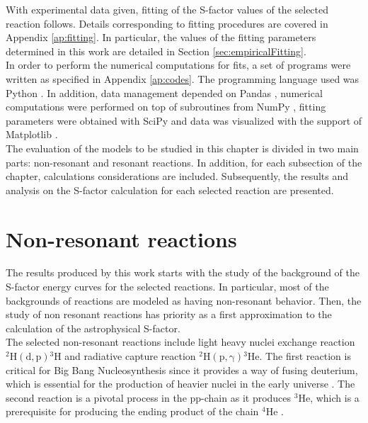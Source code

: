 \documentclass[openany]{book}
\begin{document}
With experimental data given, fitting of the S-factor values of the selected reaction follows. Details corresponding to fitting procedures are covered in Appendix \ref{ap:fitting}.  In particular, the values of the fitting parameters determined in this work are detailed in Section \ref{sec:empiricalFitting}.  \\

In order to perform the numerical computations for fits, a set of programs were written as specified in Appendix \ref{ap:codes}. The programming language used was Python \cite{rossum_drake_2009}. In addition, data management depended on Pandas \cite{mckinney_2010}, numerical computations were performed on top of subroutines from NumPy  \cite{harris_millman_vanderwalt_gommers_virtanen_cournapeau_wieser_taylor_berg_smith_et_2020}, fitting parameters were obtained with SciPy \cite{virtanen_gommers_oliphant_haberland_reddy_cournapeau_burovski_peterson_weckesser_bright_et_2020} and data was visualized with the support of Matplotlib \cite{hunter_2007}. \\

The evaluation of the models to be studied in this chapter is divided in two main parts: non-resonant and resonant reactions.  In addition, for each subsection of the chapter, calculations considerations are included. Subsequently, the results and analysis on the S-factor calculation for each  selected reaction are presented.

\section{Non-resonant reactions} \label{sec:nonResonant}

The  results produced by this work starts with the study of the background of the S-factor energy curves for the selected reactions. In particular, most of the backgrounds of reactions are modeled as having non-resonant behavior. Then, the study of non resonant reactions has priority as a first approximation to the calculation of the astrophysical S-factor. \\

The selected non-resonant reactions include light heavy nuclei exchange reaction $\mathrm{{}^{2}{H}(d,p){}^{3}{H}} $ and radiative capture reaction  $\mathrm{{}^{2}{H} (p, \gamma) {}^{3}{He}} $. The first reaction is critical for Big Bang Nucleosynthesis since it provides a way of fusing deuterium, which is essential for the production of heavier nuclei in the early universe \cite{coc_vangioni_2010}. The second reaction is a pivotal process in the pp-chain as it produces $\mathrm{{}^{3}He}$, which is a prerequisite  for producing the ending product of the chain $\mathrm{{}^{4}He}$ \cite{fowler_1958}. \\
\end{document}
